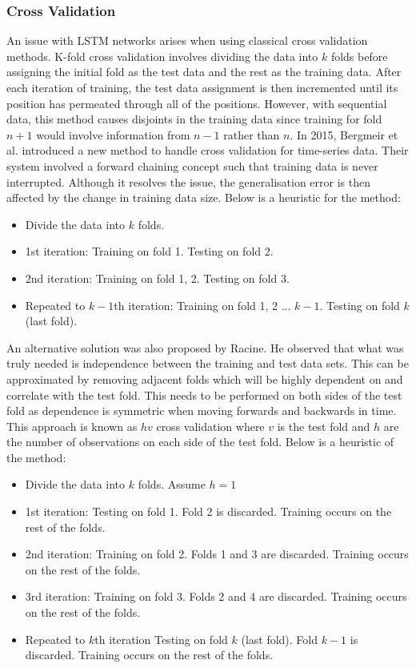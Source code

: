\documentclass[10pt,onecolumn,letterpaper]{article}
\begin{document}
\subsubsection{Cross Validation} \label{cross validation}

An issue with LSTM networks arises when using classical cross validation methods. K-fold cross validation involves dividing the data into $k$ folds before assigning the initial fold as the test data and the rest as the training data. After each iteration of training, the test data assignment is then incremented until its position has permeated through all of the positions. However, with sequential data, this method causes disjoints in the training data since training for fold $n+1$ would involve information from $n-1$ rather than $n$. In 2015, Bergmeir et al. introduced a new method\cite{Bergmeir} to handle cross validation for time-series data. Their system involved a forward chaining concept such that training data is never interrupted. Although it resolves the issue, the generalisation error is then affected by the change in training data size. Below is a heuristic for the method: 

\begin{itemize}
 	\item Divide the data into $k$ folds. 
	\item 1st iteration: Training on fold 1. Testing on fold 2.
	\item 2nd iteration: Training on fold 1, 2. Testing on fold 3. 
	\item Repeated to $k-1$th iteration: Training on fold 1, 2 ... $k-1$. Testing on fold $k$ (last fold). 
\end{itemize}

An alternative solution\cite{Racine} was also proposed by Racine. He observed that what was truly needed is independence between the training and test data sets. This can be approximated by removing adjacent folds which will be highly dependent on and correlate with the test fold. This needs to be performed on both sides of the test fold as dependence is symmetric when moving forwards and backwards in time. This approach is known as $hv$ cross validation where $v$ is the test fold and $h$ are the number of observations on each side of the test fold. Below is a heuristic of the method:

\begin{itemize}
 	\item Divide the data into $k$ folds. Assume $h = 1$ 
	\item 1st iteration: Testing on fold 1. Fold 2 is discarded. Training occurs on the rest of the folds. 
	\item 2nd iteration: Training on fold 2.  Folds 1 and 3 are discarded. Training occurs on the rest of the folds. 
	\item 3rd iteration: Training on fold 3.  Folds 2 and 4 are discarded. Training occurs on the rest of the folds. 
	\item Repeated to $k$th iteration Testing on fold $k$ (last fold). Fold $k-1$ is discarded. Training occurs on the rest of the folds. 
\end{itemize}
\end{document}
